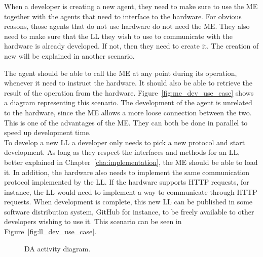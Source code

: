 When a developer is creating a new agent, they need to make sure to use the \acrlong{ME} together with the agents that need to interface to the hardware. For obvious reasons, those agents that do not use hardware do not need the \acrshort{ME}. They also need to make sure that the \acrshort{LL} they wish to use to communicate with the hardware is already developed. If not, then they need to create it. The creation of new  will be explained in another scenario. 

The agent should be able to call the \acrshort{ME} at any point during its operation, whenever it need to instruct the hardware. It should also be able to retrieve the result of the operation from the hardware. Figure~\ref{fig:me_dev_use_case} shows a diagram representing this scenario. The development of the agent is unrelated to the hardware, since the \acrshort{ME} allows a more loose connection between the two. This is one of the advantages of the \acrlong{ME}. They can both be done in parallel to speed up development time.\\

To develop a new \acrlong{LL} a developer only needs to pick a new protocol and start development. As long as they respect the interfaces and methods for an \acrshort{LL}, better explained in Chapter~\ref{cha:implementation}, the \acrshort{ME} should be able to load it. In addition, the hardware also needs to implement the same communication protocol implemented by the \acrshort{LL}. If the hardware supports \acrshort{HTTP} requests, for instance, the \acrshort{LL} would need to implement a way to communicate through \acrshort{HTTP} requests. When development is complete, this new \acrshort{LL} can be published in some software distribution system, GitHub for instance, to be freely available to other developers wishing to use it. This scenario can be seen in Figure~\ref{fig:ll_dev_use_case}.

\begin{figure}[h!]
	\centering
	\hspace{0.50cm}
	\caption{\acrlong{DA} activity diagram.}
	\label{fig:dev_use_case}
\end{figure}


